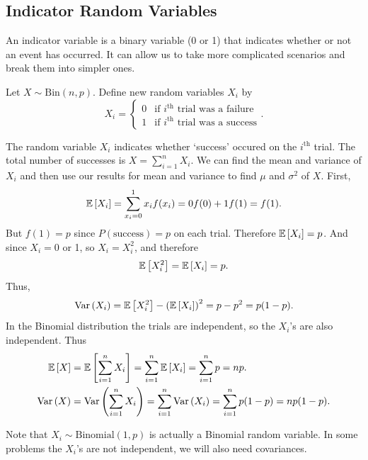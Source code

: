 \subsection{Indicator Random Variables}

An indicator variable is a binary variable (0 or 1) that indicates whether or not an event has occurred. It can allow us to take more complicated scenarios and break them into simpler ones.

\begin{example}
    Let $X \sim \text{Bin}(n,p)$. Define new random variables $X_i$ by \vspace{-3mm}
    \[
        X_i = 
        \begin{cases} 
            0 & \text{if $i^{\text{th}}$ trial was a failure} \\
            1 & \text{if $i^{\text{th}}$ trial was a success}
        \end{cases}.
    \]

    The random variable $X_i$ indicates whether `success' occured on the $i^\text{th}$ trial. The total number of successes is $X = \displaystyle \sum_{i=1}^{n} X_i$. We can find the mean and variance of $X_i$ and then use our results for mean and variance to find $\mu$ and $\sigma^2$ of $X$. First, \vspace{-3mm}
    \[
        \mathbb{E}\left[{X_i}\right] = \displaystyle \sum_{x_i=0}^{1} x_i f(x_i) = 0f(0) + 1f(1) = f(1). 
    \]
    But $f(1) = p$ since $P(\text{success}) = p$ on each trial. Therefore $\mathbb{E}\left[{X_i}\right] = p$. And since $X_i = 0$ or 1, so $X_i = X_i^2$, and therefore 
    \[
        \mathbb{E}\left[{X_i^2}\right] = \mathbb{E}\left[{X_i}\right] = p.
    \]
    Thus, 
    \[
        \operatorname{Var}\left({X_i}\right) = \mathbb{E}\left[{X_i^2}\right] - \left( \mathbb{E}\left[{X_i}\right] \right)^2 = p - p^2 = p(1-p).
    \]
    In the Binomial distribution the trials are independent, so the $X_i$'s are also independent. Thus
    \begin{align*}
        \mathbb{E}\left[{X}\right] &= \mathbb{E}\left[{\displaystyle \sum_{i=1}^{n} X_i}\right] = \displaystyle \sum_{i=1}^{n} \mathbb{E}\left[{X_i}\right] = \displaystyle \sum_{i=1}^{n} p = np. \\
        \operatorname{Var}\left({X}\right) &= \operatorname{Var}\left({\displaystyle \sum_{i=1}^{n} X_i}\right) = \displaystyle \sum_{i=1}^{n} \operatorname{Var}\left({X_i}\right) = \displaystyle \sum_{i=1}^{n} p(1-p) = np(1-p).
    \end{align*}
\end{example}

\begin{remark}
    Note that $X_i \sim \text{Binomial}(1,p)$ is actually a Binomial random variable. In some problems the $X_i$'s are not independent, we will also need covariances.
\end{remark}


